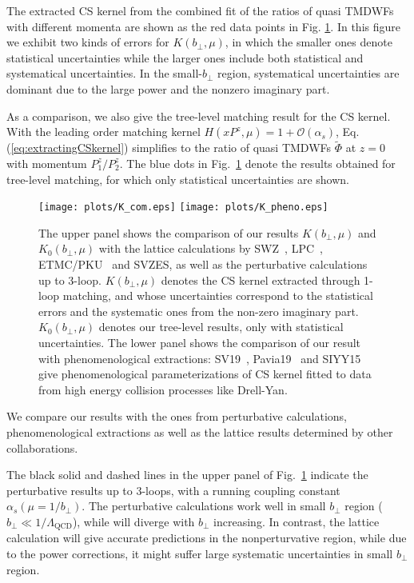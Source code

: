 \documentclass[prd,aps,twocolumn,preprintnumbers, showpacs, nofootinbib,superscriptaddress,notitlepage]{revtex4-1}
\begin{document}
The extracted CS kernel from the combined fit of the ratios of quasi TMDWFs  with different momenta are shown as the red data points in Fig. \ref{fig:K_com}. {In this figure we exhibit two kinds of errors for $K(b_{\perp},\mu)$, in which the smaller ones denote statistical uncertainties while the larger ones include both statistical and systematical uncertainties}. In the small-$b_{\perp}$ region, systematical uncertainties are dominant due to the large power and the nonzero imaginary part. 

As a comparison, we also give the tree-level matching  result for the CS kernel.  With the leading order matching kernel $H(xP^z,\mu)=1+\mathcal{O}(\alpha_s)$, Eq. (\ref{eq:extractingCSkernel}) simplifies to the ratio of quasi TMDWFs $\tilde{\Phi}$ at $z=0$ with momentum $P_1^z/P^z_2$. The blue dots in Fig.~\ref{fig:K_com} denote the results obtained for tree-level matching, for which only statistical uncertainties are shown. 

\begin{figure}
\centering
\texttt{[image: plots/K\_com.eps]}
\texttt{[image: plots/K\_pheno.eps]}
\caption{{The upper panel shows the comparison of our results $K(b_{\perp},\mu)$ and $K_0(b_{\perp},\mu)$ with the lattice calculations by SWZ~\cite{Shanahan:2021tst}, LPC~\cite{LatticeParton:2020uhz}, ETMC/PKU~\cite{Li:2021wvl} and SVZES\cite{Schlemmer:2021aij}, as well as the perturbative calculations up to 3-loop. $K(b_{\perp},\mu)$ denotes the CS kernel extracted through 1-loop matching, and whose uncertainties correspond to the statistical errors and the systematic ones from the non-zero imaginary part. $K_0(b_{\perp},\mu)$ denotes our tree-level results, only with statistical uncertainties. The lower panel shows the comparison of our result with phenomenological extractions: SV19~\cite{Scimemi:2019cmh}, Pavia19~\cite{Bacchetta:2019sam} and SIYY15~\cite{Sun:2014dqm} give phenomenological parameterizations of CS kernel fitted to data from} high energy collision processes like Drell-Yan.}
\label{fig:K_com}
\end{figure}

We compare our results with the ones from perturbative calculations, phenomenological extractions as well as the lattice results determined by other collaborations. 

The black solid and dashed lines in the upper panel of Fig.~\ref{fig:K_com} indicate the perturbative results  up to 3-loops, with a running coupling constant $\alpha_s(\mu=1/b_{\perp})$. The perturbative calculations work well in small $b_{\perp}$ region ($b_{\perp}\ll1/\Lambda_{\mathrm{QCD}}$), while will diverge with $b_{\perp}$ increasing. In contrast, the lattice calculation will give accurate predictions in the nonperturvative region, while due to the power corrections, it 
might suffer large systematic uncertainties in small $b_{\perp}$ region.
\end{document}
